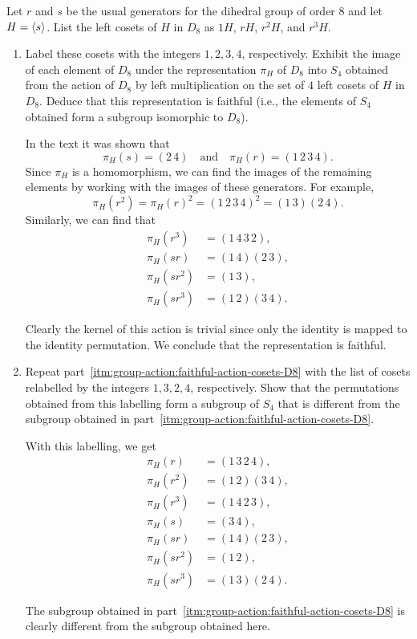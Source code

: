  Let $r$ and $s$ be the usual generators for the dihedral
group of order $8$ and let $H = \langle{s}\rangle$. List the left cosets of $H$
in $D_8$ as $1H$, $rH$, $r^2H$, and $r^3H$.
\begin{enumerate}
\item \label{itm:group-action:faithful-action-cosets-D8}
  Label these cosets with the integers $1,2,3,4$,
  respectively. Exhibit the image of each element of $D_8$ under the
  representation $\pi_H$ of $D_8$ into $S_4$ obtained from the action
  of $D_8$ by left multiplication on the set of $4$ left cosets of $H$
  in $D_8$. Deduce that this representation is faithful (i.e., the
  elements of $S_4$ obtained form a subgroup isomorphic to $D_8$).
  \begin{solution}
    In the text it was shown that
    \begin{equation*}
      \pi_H(s) = (2\,4) \quad\text{and}\quad
      \pi_H(r) = (1\,2\,3\,4).
    \end{equation*}
    Since $\pi_H$ is a homomorphism, we can find the images of the
    remaining elements by working with the images of these
    generators. For example,
    \begin{equation*}
      \pi_H(r^2) = \pi_H(r)^2 = (1\,2\,3\,4)^2 = (1\,3)(2\,4).
    \end{equation*}
    Similarly, we can find that
    \begin{align*}
      \pi_H(r^3) &= (1\,4\,3\,2), \\
      \pi_H(sr) &= (1\,4)(2\,3), \\
      \pi_H(sr^2) &= (1\,3), \\
      \pi_H(sr^3) &= (1\,2)(3\,4).
    \end{align*}

    Clearly the kernel of this action is trivial since only the
    identity is mapped to the identity permutation. We conclude that
    the representation is faithful.
  \end{solution}

\item Repeat part~\ref{itm:group-action:faithful-action-cosets-D8}
  with the list of cosets relabelled by the integers $1,3,2,4$,
  respectively. Show that the permutations obtained from this
  labelling form a subgroup of $S_4$ that is different from the
  subgroup obtained in
  part~\ref{itm:group-action:faithful-action-cosets-D8}.
  \begin{solution}
    With this labelling, we get
    \begin{align*}
      \pi_H(r) &= (1\,3\,2\,4), \\
      \pi_H(r^2) &= (1\,2)(3\,4), \\
      \pi_H(r^3) &= (1\,4\,2\,3), \\
      \pi_H(s) &= (3\,4), \\
      \pi_H(sr) &= (1\,4)(2\,3), \\
      \pi_H(sr^2) &= (1\,2), \\
      \pi_H(sr^3) &= (1\,3)(2\,4).
    \end{align*}
  \end{solution}
  The subgroup obtained in
  part~\ref{itm:group-action:faithful-action-cosets-D8} is clearly
  different from the subgroup obtained here.


\end{enumerate}

